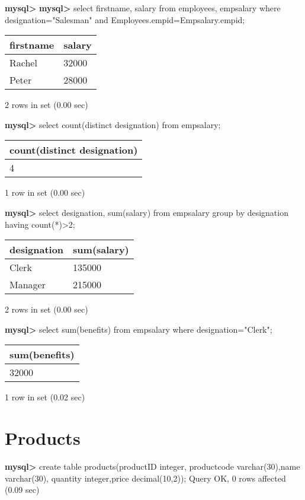\documentclass[11pt]{article}
\begin{document}
\textbf{mysql>}
\textbf{mysql>} select firstname, salary from employees, empsalary where designation="Salesman" and Employees.empid=Empsalary.empid;
\begin{center}
\begin{tabular}{|l|l|}
\hline
firstname & salary \\
\hline
Rachel & 32000 \\
Peter & 28000 \\
\hline
\end{tabular}
\end{center}
2 rows in set (0.00 sec)

\textbf{mysql>} select count(distinct designation) from empsalary;
\begin{center}
\begin{tabular}{|l|}
\hline
count(distinct designation) \\
\hline
4 \\
\hline
\end{tabular}
\end{center}
1 row in set (0.00 sec)

\textbf{mysql>} select designation, sum(salary) from empsalary group by designation having count(*)>2;
\begin{center}
\begin{tabular}{|l|l|}
\hline
designation & sum(salary) \\
\hline
Clerk & 135000 \\
Manager & 215000 \\
\hline
\end{tabular}
\end{center}
2 rows in set (0.00 sec)

\textbf{mysql>} select sum(benefits) from empsalary where designation="Clerk";
\begin{center}
\begin{tabular}{|l|}
\hline
sum(benefits) \\
\hline
32000 \\
\hline
\end{tabular}
\end{center}
1 row in set (0.02 sec)

\section{Products}
\label{sec:org5ae0e37}
\textbf{mysql>} create table products(productID integer, productcode varchar(30),name varchar(30), quantity integer,price decimal(10,2));
Query OK, 0 rows affected (0.09 sec)
\end{document}
